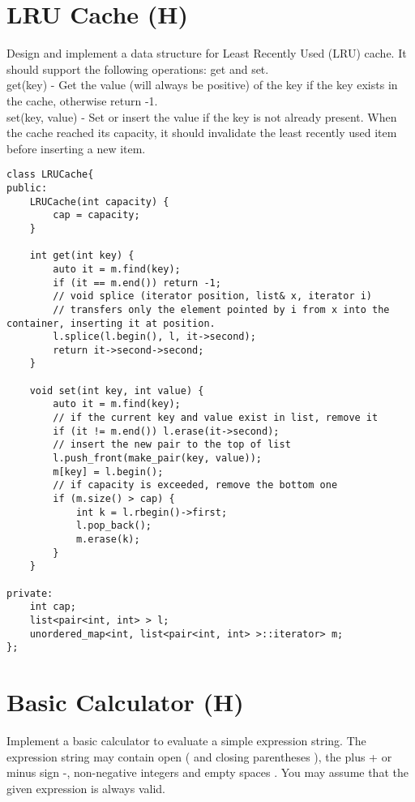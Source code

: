 \section{LRU Cache (H)}
Design and implement a data structure for Least Recently Used (LRU) cache. It should support the following operations: get and set.\\

get(key) - Get the value (will always be positive) of the key if the key exists in the cache, otherwise return -1.\\
set(key, value) - Set or insert the value if the key is not already present. When the cache reached its capacity, it should invalidate the least recently used item before inserting a new item. \\

\begin{lstlisting}
class LRUCache{
public:
    LRUCache(int capacity) {
        cap = capacity;
    }
    
    int get(int key) {
        auto it = m.find(key);
        if (it == m.end()) return -1;
        // void splice (iterator position, list& x, iterator i)
        // transfers only the element pointed by i from x into the container, inserting it at position.
        l.splice(l.begin(), l, it->second);
        return it->second->second;
    }
    
    void set(int key, int value) {
        auto it = m.find(key);
        // if the current key and value exist in list, remove it
        if (it != m.end()) l.erase(it->second);
        // insert the new pair to the top of list
        l.push_front(make_pair(key, value)); 
        m[key] = l.begin();
        // if capacity is exceeded, remove the bottom one
        if (m.size() > cap) {
            int k = l.rbegin()->first;
            l.pop_back();
            m.erase(k);
        }
    }
    
private:
    int cap;
    list<pair<int, int> > l;
    unordered_map<int, list<pair<int, int> >::iterator> m;
};
\end{lstlisting}


\section{Basic Calculator (H)}
Implement a basic calculator to evaluate a simple expression string. The expression string may contain open ( and closing parentheses ), the plus + or minus sign -, non-negative integers and empty spaces . You may assume that the given expression is always valid.\\

